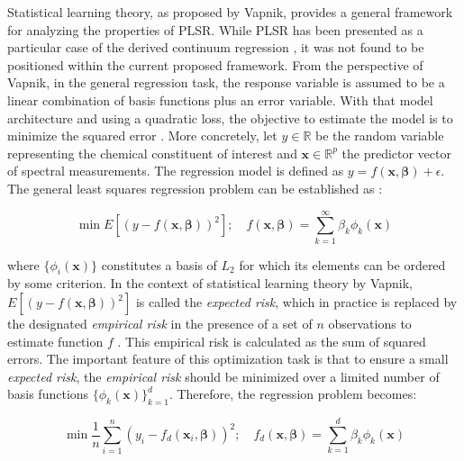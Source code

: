 \documentclass[journal=ancham,manuscript=article]{achemso}
\begin{document}
Statistical learning theory, as proposed by Vapnik\cite{Chapelle2002}, provides a general framework for analyzing the properties of PLSR. While PLSR has been presented as a particular case of the derived continuum regression \cite{Stone1990}, it was not found to be positioned within the current proposed framework. From the perspective of Vapnik, in the general regression task, the response variable is assumed to be a linear combination of basis functions plus an error variable. With that model architecture and using a quadratic loss, the objective to estimate the model is to minimize the squared error \cite{Chapelle2002}. More concretely, let $y \in \mathbb{R}$ be the random variable representing the chemical constituent of interest and  $\mathbf{x} \in \mathbb{R}^{p}$ the predictor vector of spectral measurements. The regression model is defined as $y = f(\mathbf{x}, \boldsymbol{\beta}) + \epsilon$.  The general least squares regression problem can be established as \cite{Chapelle2002}:

\begin{equation}
    \min E \left[ (y-f(\mathbf{x}, \boldsymbol{\beta}))^2\right]; \quad f(\mathbf{x}, \boldsymbol{\beta}) = \sum_{k=1}^{\infty} \beta_k \phi_{k}(\mathbf{x})
    \label{eq_general_regression_problem}
\end{equation}

where $\{\phi_{i}(\mathbf{x})\}$ constitutes a basis of $L_2$ for which its elements can be ordered by some criterion. In the context of statistical learning theory by Vapnik, $E \left[ (y-f(\mathbf{x}, \boldsymbol{\beta}))^2\right]$ is called the \emph{expected risk}, which in practice is replaced by the designated \emph{empirical risk} in the presence of a set of $n$ observations to estimate function $f$ \cite{Vapnik2000}. This empirical risk is calculated as the sum of squared errors. The important feature of this optimization task is that to ensure a small \emph{expected risk}, the \emph{empirical risk} should be minimized over a limited number of basis functions $\{\phi_{k}(\mathbf{x})\}_{k=1}^d$. Therefore, the regression problem becomes:

\begin{equation}
    \min \frac{1}{n} \sum_{i=1}^n (y_i-f_d(\mathbf{x}_i, \boldsymbol{\beta}))^2; \quad f_d(\mathbf{x}, \boldsymbol{\beta}) = \sum_{k=1}^{d} \beta_k \phi_{k}(\mathbf{x})
    \label{eq_square_loss_empirical_regression_problem}
\end{equation}
\end{document}
